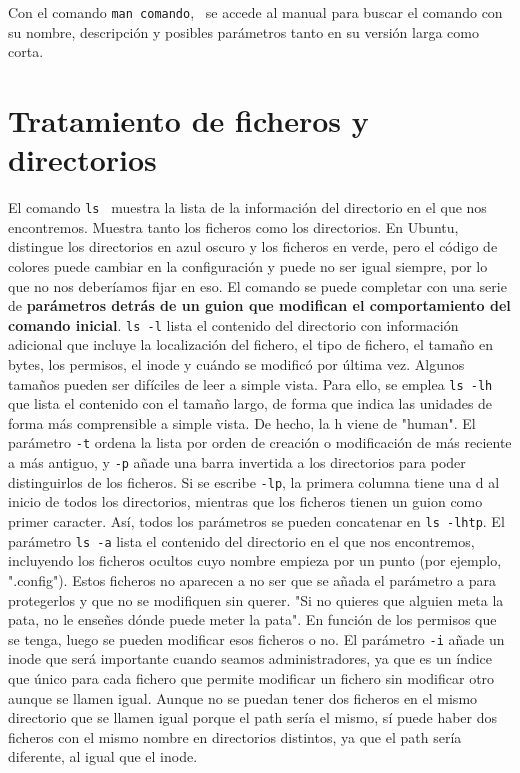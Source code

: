 \documentclass{config/apuntes}
\begin{document}
Con el comando \texttt{man comando},   \ se accede al manual para buscar el comando con su nombre, descripción y posibles parámetros tanto en su versión larga como corta.

\section{Tratamiento de ficheros y directorios}
El comando \texttt{ls} \marginpar[\footnotesize ls]  \  muestra la lista de la información del directorio en el que nos encontremos. Muestra tanto los ficheros como los directorios. En Ubuntu, distingue los directorios en azul oscuro y los ficheros en verde, pero el código de colores puede cambiar en la configuración y puede no ser igual siempre, por lo que no nos deberíamos fijar en eso.  El comando se puede completar con una serie de \textbf{parámetros detrás de un guion que modifican el comportamiento del comando inicial}. \texttt{ls -l} lista el contenido del directorio con información adicional que incluye la localización del fichero, el tipo de fichero, el tamaño en bytes, los permisos, el inode y cuándo se modificó por última vez. Algunos tamaños pueden ser difíciles de leer a simple vista. Para ello, se emplea \texttt{ls -lh} que lista el contenido con el tamaño largo, de forma que indica las unidades de forma más comprensible a simple vista. De hecho, la h viene de "human".  El parámetro \texttt{-t} ordena la lista por orden de creación o modificación de más reciente a más antiguo, y \texttt{-p} añade una barra invertida a los directorios para poder distinguirlos de los ficheros. Si se escribe \texttt{-lp}, la primera columna tiene una d al inicio de todos los directorios, mientras que los ficheros tienen un guion como primer caracter. Así, todos los parámetros se pueden concatenar en \texttt{ls -lhtp}. El parámetro \texttt{ls -a} lista el contenido del directorio en el que nos encontremos, incluyendo los ficheros ocultos cuyo nombre empieza por un punto (por ejemplo, ".config"). Estos ficheros no aparecen a no ser que se añada el parámetro a para protegerlos y que no se modifiquen sin querer. "Si no quieres que alguien meta la pata, no le enseñes dónde puede meter la pata". En función de los permisos que se tenga, luego se pueden modificar esos ficheros o no. El parámetro \texttt{-i} añade un inode que será importante cuando seamos administradores, ya que es un índice que único para cada fichero que permite modificar un fichero sin modificar otro aunque se llamen igual. Aunque no se puedan tener dos ficheros en el mismo directorio que se llamen igual porque el path sería el mismo, sí puede haber dos ficheros con el mismo nombre en directorios distintos, ya que el path sería diferente, al igual que el inode.
\end{document}
